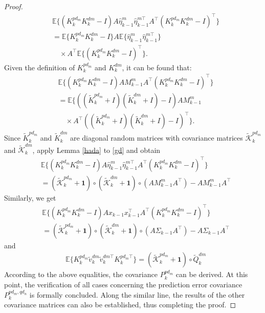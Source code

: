 \documentclass[twocolumn]{IEEEtran}
\begin{document}
\begin{proof}
\begin{equation*}
\begin{split}
&\mathbb{E}\{(K_{k}^{pd_m}K_{k}^{dm}-I)A\hat{\eta}_{k-1}^{m}\hat{\eta}_{k-1}^{m\top} A^\top(K_{k}^{pd_m}K_{k}^{dm}-I)^\top\}\\
&=\mathbb{E}\{K_{k}^{pd_m}K_{k}^{dm}-I\}A\mathbb{E}\{\hat{\eta}_{k-1}^{m}\hat{\eta}_{k-1}^{m\top}\}\\ 
&\quad\times A^\top\mathbb{E}\{(K_{k}^{pd_m}K_{k}^{dm}-I)^\top\} .
\end{split}
\end{equation*}
Given the definition of $K_{k}^{pd_m}$ and $K_{k}^{dm}$, it can be found that:
\begin{equation}\label{gd}
\begin{split}
&\mathbb{E}\{(K_{k}^{pd_m}K_{k}^{dm}-I)AM_{k-1}^{m}A^\top(K_{k}^{pd_m}K_{k}^{dm}-I)^\top\}\\
 &=\mathbb{E}\{((\tilde{K}_{k}^{pd_m}+I)(\tilde{K}_{k}^{dm}+I)-I)AM_{k-1}^{m}\\
 &\quad\times A^\top((\tilde{K}_{k}^{pd_m}+I)(\tilde{K}_{k}^{dm}+I)-I)^\top\} .
\end{split}
\end{equation}
Since $\tilde{K}_{k}^{pd_m}$ and $\tilde{K}_{k}^{dm}$ are diagonal random matrices with covariance matrices $\tilde{\mathscr{K}}_{k}^{pd_m}$ and $\tilde{\mathscr{K}}_{k}^{dm}$, apply Lemma \ref{hada} to \eqref{gd} and obtain
\begin{equation*}
\begin{split}
&\mathbb{E}\{(K_{k}^{pd_m}K_{k}^{dm}-I)A\hat{\eta}_{k-1}^{m}\hat{\eta}_{k-1}^{m\top} A^\top(K_{k}^{pd_m}K_{k}^{dm}-I)^\top\}\\
 &=(\tilde{\mathscr{K}}_{k}^{pd_m}+\mathbf{1})\circ(\tilde{\mathscr{K}}_{k}^{dm}+\mathbf{1})\circ(AM_{k-1}^{m}A^\top)-AM_{k-1}^{m}A^\top
\end{split}
\end{equation*}
Similarly, we get
\begin{equation}
\begin{split}
&\mathbb{E}\{(K_{k}^{pd_m}K_{k}^{dm}-I)Ax_{k-1}x_{k-1}^\top A^\top(K_{k}^{pd_m}K_{k}^{dm}-I)^\top\}\\
&=(\tilde{\mathscr{K}}_{k}^{pd_m}+\mathbf{1})\circ(\tilde{\mathscr{K}}_{k}^{dm}+\mathbf{1})\circ(A\Sigma_{k-1}A^\top)-A\Sigma_{k-1}A^\top
\end{split}
\end{equation}
and
\begin{equation*}
\begin{split}
&\mathbb{E}\{K_{k}^{pd_m}\tilde{v}_{k}^{dm}\tilde{v}_{k}^{dm\top} K_{k}^{pd_m\top}\}=(\tilde{\mathscr{K}}_{k}^{pd_m}+\mathbf{1})\circ\tilde{Q}_{k}^{dm}
\end{split}
\end{equation*}
According to the above equalities, the covariance $P_{k}^{pd_m}$ can be derived. At this point, the verification of all cases concerning the prediction error covariance $P_{k}^{pd_m,qd_n}$ is formally concluded. Along the similar line, the results of the other covariance matrices can also be established, thus completing the proof. 
\end{proof}
\end{document}

